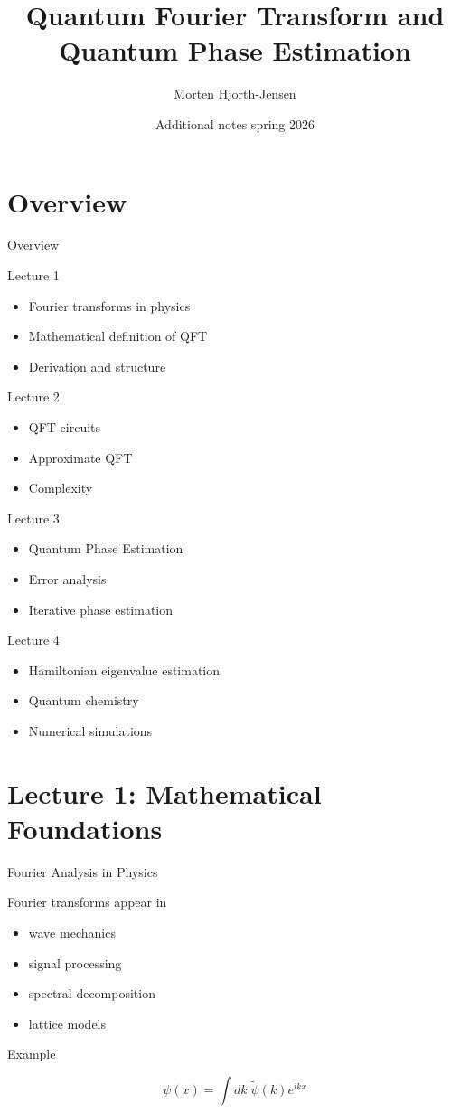 \documentclass{beamer}
\title{Quantum Fourier Transform and Quantum Phase Estimation}
\author{Morten Hjorth-Jensen}
\date{Additional notes spring 2026}
\begin{document}
\frame{\titlepage}

\section{Overview}

\begin{frame}{Overview}

Lecture 1

\begin{itemize}
\item Fourier transforms in physics
\item Mathematical definition of QFT
\item Derivation and structure
\end{itemize}

Lecture 2

\begin{itemize}
\item QFT circuits
\item Approximate QFT
\item Complexity
\end{itemize}

Lecture 3

\begin{itemize}
\item Quantum Phase Estimation
\item Error analysis
\item Iterative phase estimation
\end{itemize}

Lecture 4

\begin{itemize}
\item Hamiltonian eigenvalue estimation
\item Quantum chemistry
\item Numerical simulations
\end{itemize}

\end{frame}

\section{Lecture 1: Mathematical Foundations}

\begin{frame}{Fourier Analysis in Physics}

Fourier transforms appear in

\begin{itemize}
\item wave mechanics
\item signal processing
\item spectral decomposition
\item lattice models
\end{itemize}

Example

\[
\psi(x)=\int dk \; \tilde{\psi}(k)e^{ikx}
\]

\end{frame}
\end{document}
